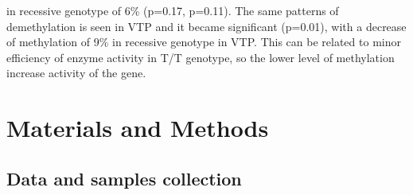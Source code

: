 \documentclass[journal,article,submit,moreauthors,pdftex]{Definitions/mdpi}
\begin{document}
in recessive genotype of 6\% (p=0.17, p=0.11). The same patterns of demethylation is seen in VTP and it became significant (p=0.01), with a decrease of methylation of 9\% in recessive genotype in VTP. This can be related to minor efficiency of enzyme activity in T/T genotype, so the lower level of methylation increase activity of the gene. 



\section{Materials and Methods}




\subsection{Data and samples collection}
\end{document}
